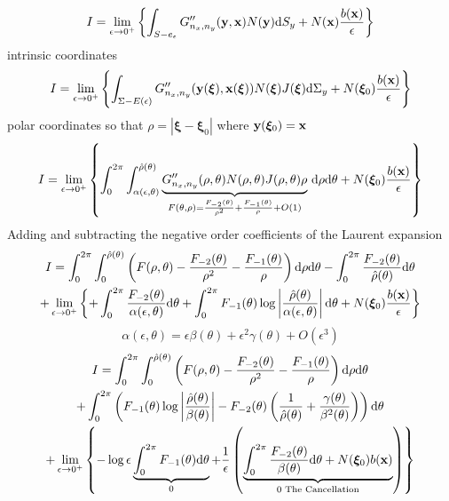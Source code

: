 \documentclass[a4paper,11pt]{article}
\newcommand{\td}{\mathrm{d}}
\begin{document}
\begin{equation}
I =
\lim_{\epsilon \to 0^+}
\left\{
\int_{S-e_{\epsilon}}
G''_{n_x,n_y}({\bf y}, {\bf x}) N({\bf y})
\td S_y
+
N({\bf x})
\frac{b({\bf x})}{\epsilon}
\right\}
\end{equation}
%
intrinsic coordinates
%
\begin{equation}
I =
\lim_{\epsilon \to 0^+}
\left\{
\int_{\Sigma-E(\epsilon)}
G''_{n_x,n_y}({\bf y}(\bm{\xi}), {\bf x}(\bm{\xi})) N(\bm{\xi}) J(\bm{\xi})
\td \Sigma_y
+
N(\bm{\xi}_0)
\frac{b({\bf x})}{\epsilon}
\right\}
\end{equation}
%
polar coordinates so that $\rho = |\bm{\xi}-\bm{\xi}_0|$ where ${\bf y}(\bm{\xi}_0) = {\bf x}$
%
\begin{equation}
I =
\lim_{\epsilon \to 0^+}
\left\{
\int_{0}^{2\pi}
\int_{\alpha(\epsilon, \theta)}^{\hat{\rho}(\theta)}
\underbrace{G''_{n_x,n_y}(\rho,\theta) N(\rho,\theta) J(\rho,\theta) \rho}_{
	F(\theta,\rho) = \frac{F_{-2}(\theta)}{\rho^2} + \frac{F_{-1}(\theta)}{\rho} + O(1)
} \,
\td \rho
\td \theta
+
N(\bm{\xi}_0)
\frac{b({\bf x})}{\epsilon}
\right\}
\end{equation}
%
Adding and subtracting the negative order coefficients of the Laurent expansion
%
\begin{multline}
I =
\int_{0}^{2\pi}
\int_{0}^{\hat{\rho}(\theta)}
\left(
	F(\rho,\theta) - \frac{F_{-2}(\theta)}{\rho^2} - \frac{F_{-1}(\theta)}{\rho}
\right)
\td \rho
\td \theta
-
\int_{0}^{2\pi}
	\frac{F_{-2}(\theta)}{\hat{\rho}(\theta)}
\td \theta
\\
+
\lim_{\epsilon \to 0^+}
\left\{
+
\int_{0}^{2\pi}
	\frac{F_{-2}(\theta)}{\alpha(\epsilon, \theta)}
\td \theta
+
\int_{0}^{2\pi}
F_{-1}(\theta) \log\left|
	\frac{\hat{\rho}(\theta)}{\alpha(\epsilon, \theta)}
	\right|
\td \theta
+
N(\bm{\xi}_0)
\frac{b({\bf x})}{\epsilon}
\right\}
\end{multline}
%
\begin{equation}
\alpha(\epsilon,\theta) = \epsilon \beta(\theta) + \epsilon^2 \gamma(\theta) + O(\epsilon^3)
\end{equation}
%
\begin{multline}
I =
\int_{0}^{2\pi}
\int_{0}^{\hat{\rho}(\theta)}
\left(
	F(\rho,\theta) - \frac{F_{-2}(\theta)}{\rho^2} - \frac{F_{-1}(\theta)}{\rho}
\right)
\td \rho
\td \theta
\\
+
\int_{0}^{2\pi}
\left(
F_{-1}(\theta) \log\left|
	\frac{\hat{\rho}(\theta)}{\beta(\theta)}
	\right|
-
	F_{-2}(\theta)
	\left(
	\frac{1}{\hat{\rho}(\theta)}
	+\frac{\gamma(\theta)}{\beta^2(\theta)}
	\right)
\right)
\td \theta
\\
+
\lim_{\epsilon \to 0^+}
\left\{
-
\log\epsilon
\underbrace{\int_{0}^{2\pi}
F_{-1}(\theta)
\td \theta}_{0}
+
\frac{1}{\epsilon}
\left(
\underbrace{
\int_{0}^{2\pi}
	\frac{F_{-2}(\theta)}{\beta(\theta)}
\td \theta
+
N(\bm{\xi}_0)
b({\bf x})
}_{0 \text{~The Cancellation}}
\right)
\right\}
\end{multline}
\end{document}
